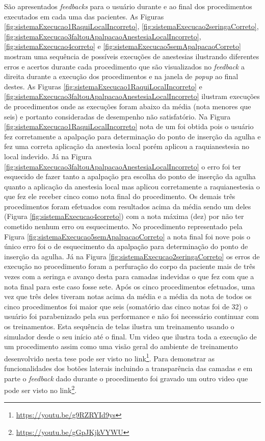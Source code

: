 São apresentados \textit{feedbacks} para o usuário durante e ao final dos procedimentos executados em cada uma das pacientes. As Figuras \ref{fig:sistemaExecucao1RaquiLocalIncorreto}, \ref{fig:sistemaExecucao2seringaCorreto}, \ref{fig:sistemaExecucao3faltouApalpacaoAnestesiaLocalIncorreto}, \ref{fig:sistemaExecucao4correto} e \ref{fig:sistemaExecucao5semApalpacaoCorreto} mostram uma sequência de possíveis execuções de anestesias ilustrando diferentes erros e acertos durante cada procedimento que são visualizados no \textit{feedback} a direita durante a execução dos procedimentos e na janela de \textit{popup} ao final destes. As Figuras \ref{fig:sistemaExecucao1RaquiLocalIncorreto} e \ref{fig:sistemaExecucao3faltouApalpacaoAnestesiaLocalIncorreto} ilustram execuções de procedimentos onde as execuções foram abaixo da média (nota menores que seis) e portanto consideradas de desempenho não satisfatório. Na Figura \ref{fig:sistemaExecucao1RaquiLocalIncorreto}  nota de um foi obtida pois o usuário fez corretamente a apalpação para determinação do ponto de inserção da agulha e fez uma correta aplicação da anestesia local porém aplicou a raquianestesia no local indevido. Já na Figura \ref{fig:sistemaExecucao3faltouApalpacaoAnestesiaLocalIncorreto} o erro foi ter esquecido de fazer tanto a apalpação pra escolha do ponto de inserção da agulha quanto a aplicação da anestesia local mas aplicou corretamente a raquianestesia o que fez ele receber cinco como nota final do procedimento. Os demais três procedimentos foram efetuados com resultados acima da média sendo um deles (Figura \ref{fig:sistemaExecucao4correto}) com a nota máxima (dez) por não ter cometido nenhum erro ou esquecimento. No procedimento representado pela Figura \ref{fig:sistemaExecucao5semApalpacaoCorreto} a nota final foi nove pois o único erro foi o de esquecimento da apalpação para determinação do ponto de inserção da agulha. Já na Figura \ref{fig:sistemaExecucao2seringaCorreto} os erros de execução no procedimento foram a perfuração do corpo da paciente mais de três vezes com a seringa e avanço desta para camadas indevidas o que fez com que a nota final para este caso fosse sete. 
Após os cinco procedimentos efetuados, uma vez que três deles tiveram notas acima da média e a média da nota de todos os cinco procedimentos foi maior que seis (somatório das cinco notas foi de 32) o usuário foi parabenizado pela sua performance e não foi necessário continuar com os treinamentos. Esta sequência de telas ilustra um treinamento usando o simulador desde o seu início até o final. Um video que ilustra toda a execução de um procedimento assim como uma visão geral do ambiente de treinamento desenvolvido nesta tese pode ser visto no link\footnote{\url{https://youtu.be/g9RZRYId9ys}}. Para demonstrar as funcionalidades dos botões laterais incluindo a transparência das camadas e em parte o \textit{feedback} dado durante o procedimento foi gravado um outro video que pode ser visto no link\footnote{\url{https://youtu.be/gGpJKjkVYWU}}.

